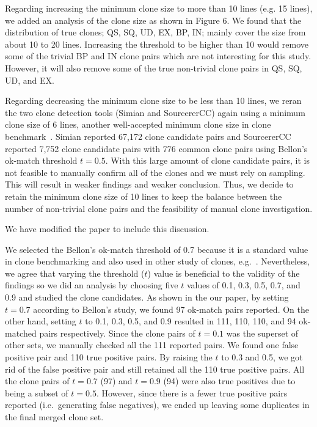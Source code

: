 \documentclass[a4paper,twoside,10pt]{reviewresponse}
\begin{document}
Regarding increasing the minimum clone size to more than 10 lines (e.g. 15 lines), we added an analysis of the clone size as shown in Figure 6. We found that the distribution of true clones; QS, SQ, UD, EX, BP, IN; mainly cover the size from about 10 to 20 lines. Increasing the threshold to be higher than 10 would remove some of the trivial BP and IN clone pairs which are not interesting for this study. However, it will also remove some of the true non-trivial clone pairs in QS, SQ, UD, and EX.

Regarding decreasing the minimum clone size to be less than 10 lines, we reran the two clone detection tools (Simian and SourcererCC) again using a minimum clone size of 6 lines, another well-accepted minimum clone size in clone benchmark~\citep{Bellon2007}. Simian reported 67,172 clone candidate pairs and SourcererCC reported 7,752 clone candidate pairs with 776 common clone pairs using Bellon's ok-match threshold $t=0.5$. With this large amount of clone candidate pairs, it is not feasible to manually confirm all of the clones and we must rely on sampling. This will result in weaker findings and weaker conclusion. Thus, we decide to retain the minimum clone size of 10 lines to keep the balance between the number of non-trivial clone pairs and the feasibility of manual clone investigation.

We have modified the paper to include this discussion.


We selected the Bellon's ok-match threshold of 0.7 because it is a standard value in clone benchmarking \citep{Bellon2007} and also used in other study of clones, e.g.~\cite{Sajnani2016}. Nevertheless, we agree that varying the threshold ($t$) value is beneficial to the validity of the findings so we did an analysis by choosing five $t$ values of 0.1, 0.3, 0.5, 0.7, and 0.9 and studied the clone candidates. As shown in the our paper, by setting $t=0.7$ according to Bellon's study, we found 97 ok-match pairs reported. On the other hand, setting $t$ to 0.1, 0.3, 0.5, and 0.9 resulted in 111, 110, 110, and 94 ok-matched pairs respectively.
Since the clone pairs of $t=0.1$ was the superset of other sets,  we manually checked all the 111 reported pairs.
We found one false positive pair and 110 true positive pairs. By raising the $t$ to 0.3 and 0.5, we got rid of the false positive pair and still retained all the 110 true positive pairs. All the clone pairs of $t=0.7$ (97) and $t=0.9$ (94) were also true positives due to being a subset of $t=0.5$. However, since there is a fewer true positive pairs reported (i.e.~generating false negatives), we ended up leaving some duplicates in the final merged clone set.
\end{document}
